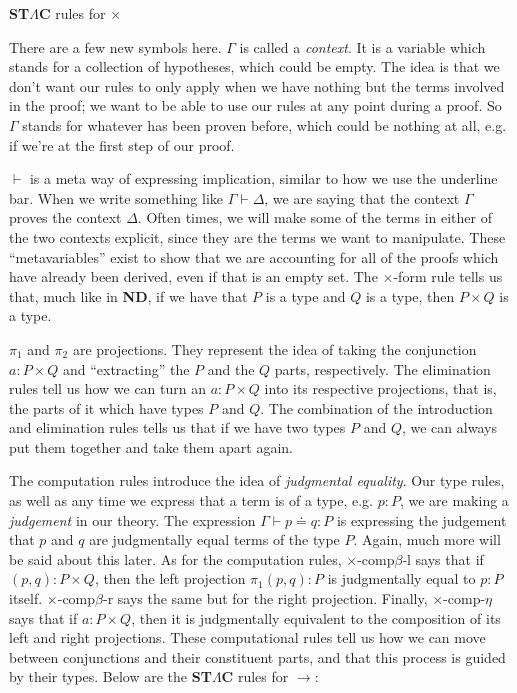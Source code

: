 \documentclass{article}
\begin{document}
\begin{center}
    \textbf{ST$\Lambda$C} rules for $\times$
\end{center}

There are a few new symbols here. $\Gamma$ is called a \emph{context}. 
It is a variable which stands for a collection of hypotheses, which could be empty. 
The idea is that we don't want our rules to only apply when we have nothing but the 
terms involved in the proof; we want to be able to use our rules at any point during a 
proof. So $\Gamma$ stands for whatever has been proven before, which could be nothing 
at all, e.g. if we're at the first step of our proof. 

$\vdash$ is a meta way of expressing implication, similar to how we use the underline
bar. When we write something like $\Gamma \vdash \Delta$, we are saying that the
context $\Gamma$ proves the context $\Delta$. Often times, we will make some of
the terms in either of the two contexts explicit, since they are the terms we want
to manipulate. These ``metavariables'' exist to show that we are accounting for all
of the proofs which have already been derived, even if that is an empty set. The 
$\times$-form rule tells us that, much like in \textbf{ND}, if we have that $P$ is
a type and $Q$ is a type, then $P \times Q$ is a type. 

$\pi_1$ and $\pi_2$ are projections. They represent the idea of taking the conjunction
$a : P \times Q$ and ``extracting'' the $P$ and the $Q$ parts, respectively. The 
elimination rules tell us how we can turn an $a : P \times Q$ into its respective
projections, that is, the parts of it which have types $P$ and $Q$. The combination
of the introduction and elimination rules tells us that if we have two types $P$ 
and $Q$, we can always put them together and take them apart again.

The computation rules introduce the idea of \emph{judgmental equality}. Our
type rules, as well as any time we express that a term is of a type, e.g. $p : P$,
we are making a \emph{judgement} in our theory. The expression 
$\Gamma \vdash p \doteq q : P$ is expressing the judgement that $p$
and $q$ are judgmentally equal terms of the type $P$. Again, much more
will be said about this later. As for the computation rules,
$\times$-comp$\beta$-l says that if $(p,q) : P \times Q$, then
the left projection $\pi_1 (p,q) : P$ is judgmentally equal to $p : P$ itself.
$\times$-comp$\beta$-r says the same but for the right projection. Finally,
$\times$-comp-$\eta$ says that if $a : P \times Q$, then it is judgmentally 
equivalent to the composition of its left and right projections. These computational
rules tell us how we can move between conjunctions and their constituent parts, and
that this process is guided by their types. Below are the \textbf{ST$\Lambda$C} 
rules for $\rightarrow$:
\end{document}
